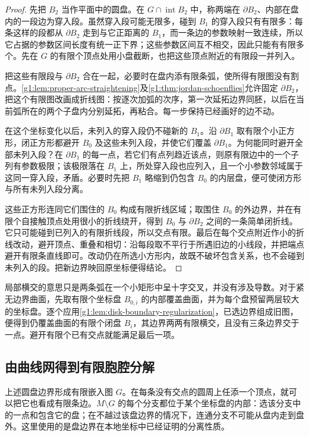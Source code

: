 \begin{proof}
	先把 \(B_2\) 当作平面中的圆盘。在 \(G\cap\operatorname{int}B_2\) 中，称两端在 \(\partial B_2\)、内部在盘内的一段边为穿入段。虽然穿入段可能无限多，碰到 \(B_1\) 的穿入段只有有限多：每条这样的段都从 \(\partial B_2\) 走到与它正距离的 \(B_1\)，而一条边的参数映射一致连续，所以它占据的参数区间长度有统一正下界；这些参数区间互不相交，因此只能有有限多个。先在 \(G\) 的有限个顶点处用小盘截断，也把这些顶点附近的有限段一并列入。

	把这些有限段与 \(\partial B_2\) 合在一起，必要时在盘内添有限条弧，使所得有限图没有割点。\cref{g1:lem:proper-arc-straightening}及\cref{g1:thm:jordan-schoenflies}允许固定 \(\partial B_2\)，把这个有限图改画成折线图：按逐次加弧的次序，第一次延拓边界同胚，以后在当前弧所在的两个子盘内分别延拓，再粘合。每一步保持已经画好的边不动。

	在这个坐标变化以后，未列入的穿入段仍不碰新的 \(B_1\)。沿 \(\partial B_1\) 取有限个小正方形，闭正方形都避开 \(B_0\) 及这些未列入段，并使它们覆盖 \(\partial B_1\)。为何能同时避开全部未列入段？在 \(\partial B_1\) 的每一点，若它们有点列趋近该点，则原有限边中的一个子列有参数极限；该极限落在 \(B_1\) 上，所处穿入段也应列入，且一个小参数邻域属于这同一穿入段，矛盾。必要时先把 \(B_1\) 略缩到仍包含 \(B_0\) 的内层盘，便可使闭方形与所有未列入段分离。

	这些正方形连同它们围住的 \(B_0\) 构成有限折线区域；取围住 \(B_0\) 的外边界，并在有限个自接触顶点处用很小的折线绕开，得到 \(B_0\) 与 \(\partial B_2\) 之间的一条简单闭折线。它只可能碰到已列入的有限折线段，所以交点有限。最后在每个交点附近作小的折线改动，避开顶点、重叠和相切：沿每段取不平行于所遇旧边的小线段，并把端点避开有限条直线即可。改动仍在所选小方形内，故既不破坏包含关系，也不会碰到未列入的段。把新边界映回原坐标便得结论。
\end{proof}

局部横交的意思只是两条弧在一个小矩形中呈十字交叉，并没有涉及导数。对于紧无边界曲面，先取有限个坐标盘 \(B_{0,i}\) 的内部覆盖曲面，并为每个盘预留两层较大的坐标盘。逐个应用\cref{g1:lem:disk-boundary-regularization}，已选边界组成旧图，便得到仍覆盖曲面的有限个闭盘 \(B_i\)，其边界两两有限横交，且没有三条边界交于一点。避开有限个已有交点就能满足最后一项。

\subsection{由曲线网得到有限胞腔分解}
\label{g1:subsec:0602:03}

上述圆盘边界形成有限嵌入图 \(G\)。在每条没有交点的圆周上任添一个顶点，就可以把它也看成有限条边。\(M\setminus G\) 的每个分支都位于某个坐标盘的内部：选该分支中的一点和包含它的盘；在不越过该盘边界的情况下，连通分支不可能从盘内走到盘外。这里使用的是盘边界在本地坐标中已经证明的分离性质。


